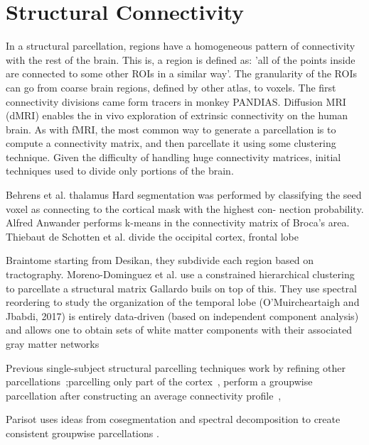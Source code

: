 \section{Structural Connectivity}
In a structural parcellation, regions have a homogeneous pattern of connectivity
with the rest of the brain. This is, a region is defined as: 'all of the points
inside are connected to some other ROIs in a similar way'. The granularity
of the ROIs can go from coarse brain regions, defined by other atlas, to voxels.
The first connectivity divisions came form tracers in monkey PANDIAS. Diffusion
MRI (dMRI) enables the in vivo exploration of extrinsic connectivity on the
human brain. As with fMRI, the most common way to generate a parcellation is
to compute a connectivity matrix, and then parcellate it using some clustering
technique. Given the difficulty of handling huge connectivity matrices, initial
techniques used to divide only portions of the brain.

Behrens et al.\cite{Behrens2003} thalamus Hard segmentation was performed by classifying the seed voxel as connecting to the cortical mask with the highest con- nection probability.
Alfred Anwander performs k-means\cite{Anwander2006} in the connectivity matrix of Broca's area.
Thiebaut de Schotten et al. divide the occipital cortex\cite{ThiebautdeSchotten2014}, frontal lobe \cite{ThiebautdeSchotten2016}

Braintome\cite{Fan2016} starting from Desikan, they subdivide each region based on tractography.
Moreno-Dominguez et al. use a constrained hierarchical clustering to parcellate a structural matrix \cite{Moreno-Dominguez2014}
Gallardo buils on top of this.
They use spectral reordering to study the organization of the temporal lobe \cite{Bajada2017}
(O'Muircheartaigh and Jbabdi, 2017) is entirely data-driven (based on independent component analysis) and allows one to obtain sets of white matter components with their associated gray matter networks \cite{Muircheartaigh2018}


Previous single-subject structural parcelling techniques work by refining other
parcellations~\cite{Clarkson2010};parcelling only part of the
cortex~\cite{Lefranc2016, Roca2009, ThiebautdeSchotten2014, ThiebautdeSchotten2016},
perform a groupwise parcellation after constructing an average connectivity profile~\cite{Clarkson2010, Roca2010},

Parisot uses ideas from cosegmentation and spectral decomposition to create consistent groupwise parcellations \cite{Paristot2015}.


